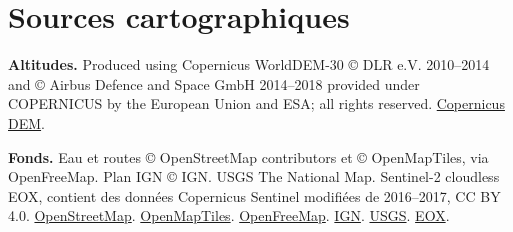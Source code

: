 \documentclass[11pt,a4paper]{article}
\begin{document}
\section{Sources cartographiques}
{\small
\textbf{Altitudes.} Produced using Copernicus WorldDEM-30 © DLR e.V. 2010–2014 and © Airbus Defence and Space GmbH 2014–2018 provided under COPERNICUS by the European Union and ESA; all rights reserved. \href{https://registry.opendata.aws/copernicus-dem/}{Copernicus DEM}.

\textbf{Fonds.} Eau et routes © OpenStreetMap contributors et © OpenMapTiles, via OpenFreeMap. Plan IGN © IGN. USGS The National Map. Sentinel-2 cloudless EOX, contient des données Copernicus Sentinel modifiées de 2016–2017, CC BY 4.0. \href{https://www.openstreetmap.org/copyright}{OpenStreetMap}. \href{https://openmaptiles.org/}{OpenMapTiles}. \href{https://openfreemap.org/}{OpenFreeMap}. \href{https://geoservices.ign.fr/services-web-experts-cartes}{IGN}. \href{https://www.usgs.gov/programs/national-geospatial-program/national-map}{USGS}. \href{https://s2maps.eu/}{EOX}.
\par}
\end{document}
